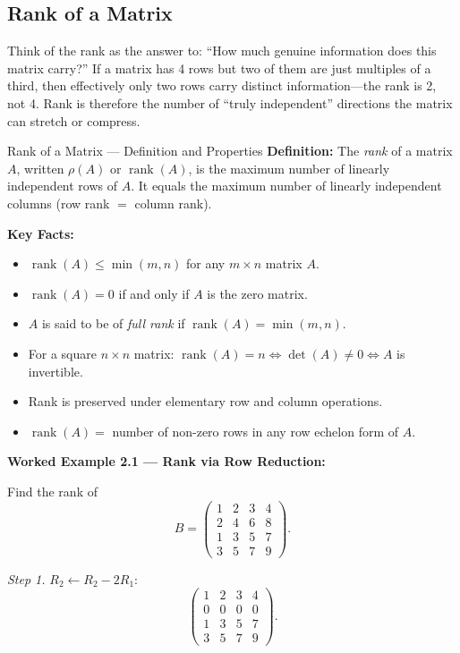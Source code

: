 \documentclass[12pt,a4paper]{article}
\begin{document}
\subsection{Rank of a Matrix}

Think of the rank as the answer to: ``How much genuine information does this matrix carry?''
If a matrix has 4 rows but two of them are just multiples of a third, then effectively only
two rows carry distinct information---the rank is 2, not 4. Rank is therefore the number of
``truly independent'' directions the matrix can stretch or compress.

\begin{infobox}{Rank of a Matrix --- Definition and Properties}
\textbf{Definition:} The \emph{rank} of a matrix $A$, written $\rho(A)$ or $\operatorname{rank}(A)$,
is the maximum number of linearly independent rows of $A$.
It equals the maximum number of linearly independent columns (row rank $=$ column rank).

\textbf{Key Facts:}
\begin{itemize}
  \item $\operatorname{rank}(A) \leq \min(m, n)$ for any $m\times n$ matrix $A$.
  \item $\operatorname{rank}(A) = 0$ if and only if $A$ is the zero matrix.
  \item $A$ is said to be of \emph{full rank} if $\operatorname{rank}(A) = \min(m,n)$.
  \item For a square $n\times n$ matrix: $\operatorname{rank}(A) = n \Leftrightarrow \det(A)\neq0 \Leftrightarrow A$ is invertible.
  \item Rank is preserved under elementary row and column operations.
  \item $\operatorname{rank}(A) = $ number of non-zero rows in any row echelon form of $A$.
\end{itemize}
\end{infobox}

\textbf{Worked Example 2.1 --- Rank via Row Reduction:}

Find the rank of
\[
B = \begin{pmatrix} 1 & 2 & 3 & 4 \\ 2 & 4 & 6 & 8 \\ 1 & 3 & 5 & 7 \\ 3 & 5 & 7 & 9 \end{pmatrix}.
\]

\textit{Step 1.} $R_2 \leftarrow R_2 - 2R_1$:
\[
\begin{pmatrix} 1 & 2 & 3 & 4 \\ 0 & 0 & 0 & 0 \\ 1 & 3 & 5 & 7 \\ 3 & 5 & 7 & 9 \end{pmatrix}.
\]
\end{document}
